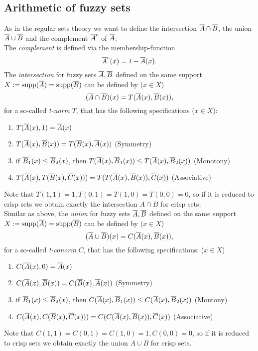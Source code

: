 \subsection{Arithmetic of fuzzy sets} \label{sec:fuzzyArithm}
As in the regular sets theory we want to define the intersection $\overline{A}\cap\overline{B}$, the union $\overline{A}\cup\overline{B}$ and the complement $\overline{A}^c$ of $\overline{A}$:\\
The \emph{complement} is defined via the membership-function
\[ \overline{A}^c(x) = 1-\overline{A}(x). \]
The \emph{intersection} for fuzzy sets $\overline{A},\overline{B}$ defined on the same support $X:=\operatorname{supp}(\overline{A})=\operatorname{supp}(\overline{B})$ can be defined by ($x\in X$)
\[ (\overline{A}\cap\overline{B})(x) = T(\overline{A}(x),\overline{B}(x)), \]
for a so-called \emph{t-norm} $T$, that has the following specifications ($x\in X$):
\begin{enumerate}[1)]
\item $T(\overline{A}(x),1)=\overline{A}(x)$
\item $T(\overline{A}(x),\overline{B}(x))=T(\overline{B}(x),\overline{A}(x))$ (Symmetry)
\item if $\overline{B}_1(x)\leq \overline{B}_2(x)$, then $T(\overline{A}(x),\overline{B}_1(x))\leq T(\overline{A}(x),\overline{B}_2(x))$ (Monotony)
\item $T(\overline{A}(x),T(\overline{B}(x),\overline{C}(x)))=T(T(\overline{A}(x),\overline{B}(x)),\overline{C}(x))$ (Associative)
\end{enumerate}
Note that $T(1,1)=1, T(0,1)=T(1,0)=T(0,0)=0$, so if it is reduced to crisp sets we obtain exactly the intersection $A\cap B$ for crisp sets.\\
Similar as above, the \emph{union} for fuzzy sets $\overline{A},\overline{B}$ defined on the same support $X:=\operatorname{supp}(\overline{A})=\operatorname{supp}(\overline{B})$ can be defined by ($x\in X$)
\[ (\overline{A}\cup\overline{B})(x) = C(\overline{A}(x),\overline{B}(x)), \]
for a so-called \emph{t-conorm} $C$, that has the following specifications:
($x\in X$)
\begin{enumerate}[1)]
\item $C(\overline{A}(x),0)=\overline{A}(x)$
\item $C(\overline{A}(x),\overline{B}(x))=C(\overline{B}(x),\overline{A}(x))$ (Symmetry)
\item if $\overline{B}_1(x)\leq \overline{B}_2(x)$, then $C(\overline{A}(x),\overline{B}_1(x))\leq C(\overline{A}(x),\overline{B}_2(x))$ (Montony)
\item $C(\overline{A}(x),C(\overline{B}(x),\overline{C}(x)))=C(C(\overline{A}(x),\overline{B}(x)),\overline{C}(x))$ (Associative)
\end{enumerate}
Note that $C(1,1)=C(0,1)=C(1,0)=1, C(0,0)=0$, so if it is reduced to crisp sets we obtain exactly the union $A\cup B$ for crisp sets.


